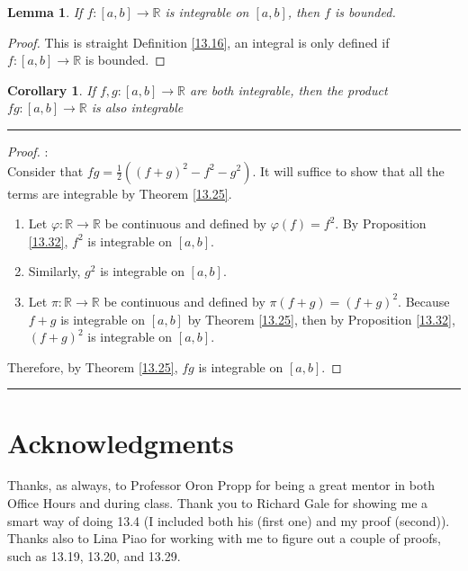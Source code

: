 \documentclass[openany, amssymb, psamsfonts]{amsart}
\newcommand{\bbR}{\mathbb{R}}
\renewcommand{\phi}{\varphi}
\newtheorem{cor}{Corollary}[section]
\newtheorem{lem}{Lemma}[section]
\theoremstyle{definition}
\numberwithin{equation}{section}
\begin{document}
\begin{lem}
    If $f: [a,b] \to \bbR$ is integrable on $[a,b]$, then $f$ is bounded.
\end{lem}
\begin{proof}
    This is straight Definition \ref{13.16}, an integral is only defined if $f:[a,b]\to \bbR$ is bounded. 
\end{proof}


\begin{cor}
    If $f, g : [a, b] \to \bbR$ are both integrable, then the product $f g : [a, b] \to \bbR$ is also integrable
\end{cor}
\vspace{4pt}     \hrule   \vspace{4pt}\begin{proof}:\\
Consider that $fg = \frac{1}{2}((f+g)^2 -f^2 - g^2).$ It will suffice to show that all the terms are integrable by Theorem \ref{13.25}. 
\begin{enumerate}
    \item Let $\phi:\bbR \to \bbR$ be continuous and defined by $\phi(f) = f^2.$ By Proposition \ref{13.32}, $f^2$ is integrable on $[a,b].$
    \item Similarly, $g^2$ is integrable on $[a,b].$
    \item Let $\pi:\bbR \to \bbR$ be continuous and defined by $\pi(f+g) = (f+g)^2.$ Because $f+g$ is integrable on $[a,b]$ by Theorem \ref{13.25}, then by Proposition \ref{13.32}, $(f+g)^2$ is integrable on $[a,b].$
\end{enumerate}
Therefore, by Theorem \ref{13.25}, $fg$ is integrable on $[a,b].$
\end{proof}\vspace{4pt}     \hrule   \vspace{4pt}

\section*{Acknowledgments} 
Thanks, as always, to Professor Oron Propp for being a great mentor in both Office Hours and during class. Thank you to Richard Gale for showing me a smart way of doing 13.4 (I included both his (first one) and my proof (second)). Thanks also to Lina Piao for working with me to figure out a couple of proofs, such as 13.19, 13.20, and 13.29.
\begin{thebibliography}{9}




\end{thebibliography}
\end{document}
